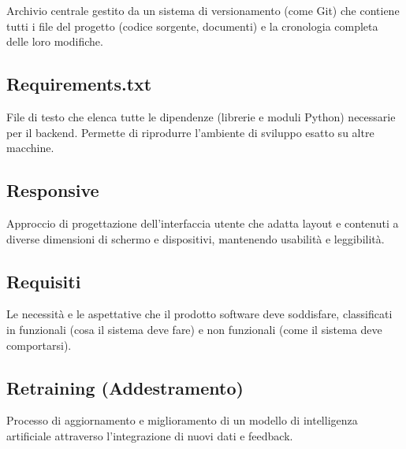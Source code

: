 \documentclass[a4paper, 11pt, oneside]{scrartcl} %
\begin{document}

Archivio centrale gestito da un sistema di versionamento (come Git) che contiene tutti i file del progetto (codice sorgente, documenti) e la cronologia completa delle loro modifiche.

\vspace{0.5cm}

\subsection*{Requirements.txt}


File di testo che elenca tutte le dipendenze (librerie e moduli Python) necessarie per il backend. Permette di riprodurre l'ambiente di sviluppo esatto su altre macchine.

\vspace{0.5cm}

\subsection*{Responsive}
Approccio di progettazione dell'interfaccia utente che adatta layout e contenuti a diverse dimensioni di schermo e dispositivi, mantenendo usabilità e leggibilità.
\vspace{0.5cm}

\subsection*{Requisiti}


Le necessità e le aspettative che il prodotto software deve soddisfare, classificati in funzionali (cosa il sistema deve fare) e non funzionali (come il sistema deve comportarsi).

\vspace{0.5cm}

\subsection*{Retraining (Addestramento)}
Processo di aggiornamento e miglioramento di un modello di intelligenza artificiale attraverso l'integrazione di nuovi dati e feedback.
\vspace{0.5cm}
\end{document}
